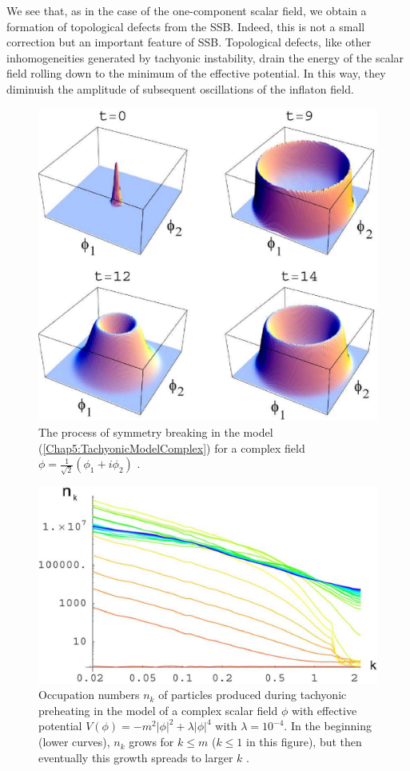 \documentclass[11pt,a4paper,twoside]{book}
\begin{document}
We see that, as in the case of the one-component scalar field, we obtain a formation of topological defects from the SSB. Indeed, this is not a small correction but an important feature of SSB. Topological defects, like other inhomogeneities generated by tachyonic instability, drain the energy of the scalar field rolling down to the minimum of the effective potential. In this way, they diminuish the amplitude of subsequent oscillations of the inflaton field.
\begin{figure}
	\centering
	\includegraphics[width=0.6\linewidth, height=0.4\textheight]{Images/Chap5/TachyonicInstability_Fig7}
	\caption{The process of symmetry breaking in the model (\ref{Chap5:TachyonicModelComplex}) for a complex field $ \phi=\frac{1}{\sqrt{2}}(\phi_{1} + i\phi_{2}) $ \cite{Chap5:TachyonicInstability}.}
	\label{fig:tachyonicinstabilityfig7}
\end{figure}
\begin{figure}
	\centering
	\includegraphics[width=0.5\linewidth, height=0.25\textheight]{Images/Chap5/TachyonicInstability_Fig8}
	\caption{Occupation numbers $ n_{k} $ of particles produced during tachyonic preheating in the model of a complex scalar field $\phi$ with effective potential $ V(\phi)=-m^{2}|\phi|^{2} + \lambda|\phi|^{4} $ with $\lambda = 10^{-4}$. In the beginning  (lower curves), $ n_{k} $ grows for $ k\le m $ ($ k\le 1 $ in this figure), but then eventually this growth spreads to larger $ k $ \cite{Chap5:TachyonicInstability}.}
	\label{fig:tachyonicinstabilityfig8}
\end{figure}
\end{document}
